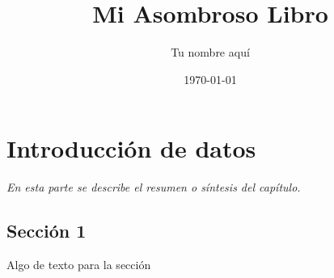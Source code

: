 \documentclass[]{book}
\title{\bf Mi Asombroso Libro}
\author{Tu nombre aquí}
\date{\today}
\begin{document}
\frontmatter
\maketitle
\tableofcontents
\mainmatter
\chapter{Introducción de datos }
\begin{center}
\textit{En esta parte se describe el resumen o síntesis
del capítulo.}
\end{center}
\section{Sección 1}
Algo de texto para la sección
\end{document}
